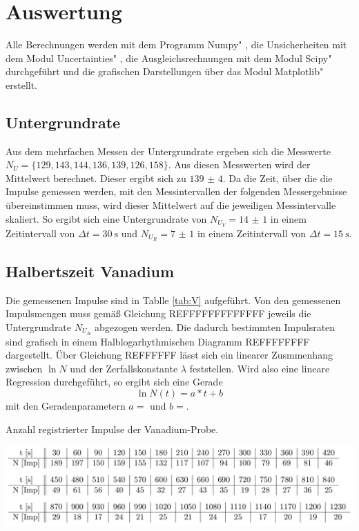 \section{Auswertung}
\label{sec:Auswertung}

Alle Berechnungen werden mit dem Programm \glqq Numpy" \cite{numpy}, die Unsicherheiten mit dem Modul \glqq Uncertainties" \cite{uncertainties}, die Ausgleichsrechnungen mit dem Modul \glqq Scipy" \cite{scipy} durchgeführt und die grafischen Darstellungen über das Modul \glqq Matplotlib" \cite{matplotlib} erstellt.

\subsection{Untergrundrate}

Aus dem mehrfachen Messen der Untergrundrate ergeben sich die Messwerte $N_U=\{ 129, 143, 144, 136, 139, 126, 158 \}$. Aus diesen Messwerten wird der Mittelwert berechnet. Dieser ergibt sich zu $\num{139(4)}$. Da die Zeit, über die die Impulse gemessen werden, mit den Messintervallen der folgenden Messergebnisse übereinstimmen muss, wird  dieser Mittelwert auf die jeweiligen Messintervalle skaliert. So ergibt sich eine Untergrundrate von $N_{U_V}=\num{14(1)}$ in einem Zeitintervall von $\Delta t=\SI{30}{\s}$ und $N_{U_R}=\num{7(1)}$ in einem Zeitintervall von $\Delta t=\SI{15}{\s}$.

\subsection{Halbertszeit Vanadium}

Die gemessenen Impulse sind in Tablle \ref{tab:V} aufgeführt. Von den gemessenen Impulsmengen muss gemäß Gleichung REFFFFFFFFFFFFF jeweils die Untergrundrate $N_{U_R}$ abgezogen werden. Die dadurch bestimmten Impulsraten sind grafisch in einem Halblogarhythmischen Diagramm REFFFFFFFF dargestellt. Über Gleichung REFFFFFF lässt sich ein linearer Zusmmenhang zwischen $\ln{N}$ und der Zerfallskonstante $\lambda $ feststellen. Wird also eine lineare Regression durchgeführt, so ergibt sich eine Gerade
\begin{equation}
    \ln{N}(t)=a*t + b
\end{equation}
mit den Geradenparametern $a=$ und $b=$. 

\begin{table}
\centering
\caption{Anzahl registrierter Impulse der Vanadium-Probe.}
\includegraphics[width=\textwidth]{data/Vanadium.png}
\label{tab:V}
\end{table}


